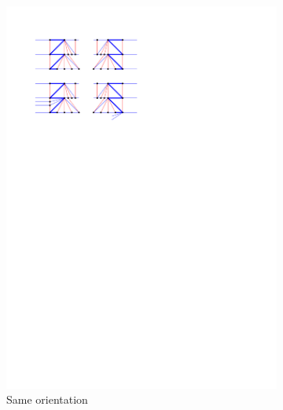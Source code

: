     \begin{figure}
      \centering
      \begin{subfigure}[b]{0.45 \textwidth}
          \includegraphics[width = \textwidth]{unifiedAlgo/img/post/sameChain}
          \caption{Same orientation}
      \end{subfigure}
      ~
      \begin{subfigure}[b]{0.45 \textwidth}

\end{subfigure}
\end{figure}
